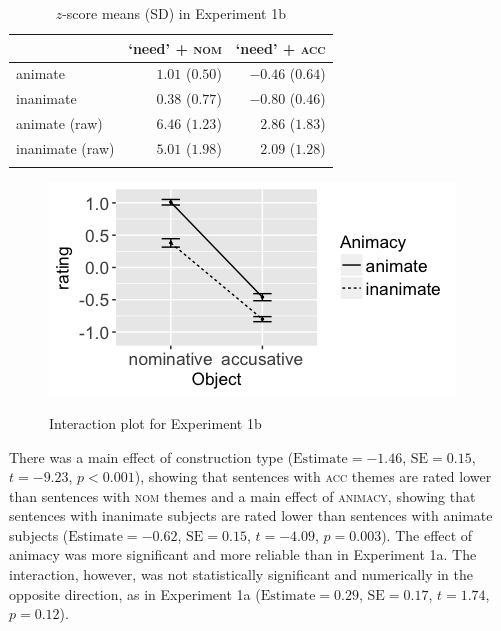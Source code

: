 \documentclass[output=paper]{langscibook}
\begin{document}

\begin{table}
\centering
\begin{tabularx}{0.65\textwidth}{Xrr}
\lsptoprule
   & `need' + \textsc{nom} & `need' + \textsc{acc}\\
\midrule
animate  &  $1.01$ ($0.50$) &   $-0.46$ ($0.64$)\\
inanimate  & $0.38$ ($0.77$) &   $-0.80$ ($0.46$)\\
animate (raw)  &   $6.46$ ($1.23$) &  $2.86$ ($1.83$)\\
inanimate (raw)  &   $5.01$ ($1.98$) & $2.09$ ($1.28$)\\
\lspbottomrule
\end{tabularx}
\caption{$z$-score means (SD) in Experiment 1b}
\label{tab:1:means-exp1b}
\end{table}

\begin{figure}
\caption{Interaction plot for Experiment 1b}
\centering
\includegraphics[scale = 0.5]{figures/exp1b_13.png}
\label{fig:exp1b}
\end{figure}

There was a main effect of construction type ($\text{Estimate} = -1.46$, $\text{SE} = 0.15$, $t = -9.23$, $p < 0.001$), showing that sentences with \textsc{acc} themes are rated lower than sentences with \textsc{nom} themes and a main effect of \textsc{animacy}, showing that sentences with inanimate subjects are rated lower than sentences with animate subjects ($\text{Estimate} = -0.62$, $\text{SE} = 0.15$, $t = -4.09$, $p = 0.003$). The effect of animacy was more significant and more reliable than in Experiment 1a. The interaction, however, was not statistically significant and numerically in the opposite direction, as in Experiment 1a ($\text{Estimate} = 0.29$, $\text{SE} = 0.17$, $t = 1.74$, $p = 0.12$).
\end{document}
